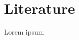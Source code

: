 \documentclass[../main.tex]{subfiles}
\begin{document}
\chapter{Literature}

Lorem ipsum
\end{document}
